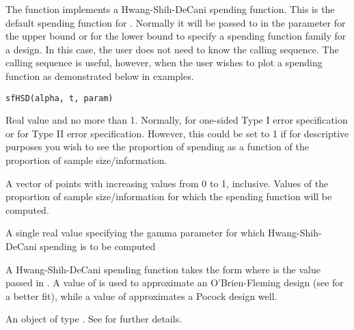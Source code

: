\begin{Description}\relax
The function  implements a Hwang-Shih-DeCani spending function.
This is the default spending function for .
Normally it will be passed to  in the parameter  for the upper bound or
 for the lower bound to specify a spending function family for a design.
In this case, the user does not need to know the calling sequence.
The calling sequence is useful, however, when the user wishes to plot a spending function as demonstrated below
in examples.
\end{Description}
\begin{Usage}
\begin{verbatim}
sfHSD(alpha, t, param)
\end{verbatim}
\end{Usage}
\begin{Arguments}
\begin{ldescription}
\item[\code{alpha}] Real value  and no more than 1. Normally, 
 for one-sided Type I error specification
or  for Type II error specification. However, this could be set to 1 if for descriptive purposes
you wish to see the proportion of spending as a function of the proportion of sample size/information.
\item[\code{t}] A vector of points with increasing values from 0 to 1, inclusive. Values of the proportion of 
sample size/information for which the spending function will be computed.
\item[\code{param}] A single real value specifying the gamma parameter for which Hwang-Shih-DeCani spending
is to be computed
\end{ldescription}
\end{Arguments}
\begin{Details}\relax
A Hwang-Shih-DeCani spending function takes the form
 where \eqn{\gamma}{} is the value passed in .
A value of  is used to approximate an O'Brien-Fleming design (see  for a better fit), 
while a value of  approximates a Pocock design well.
\end{Details}
\begin{Value}
An object of type . See  for further details.
\end{Value}
